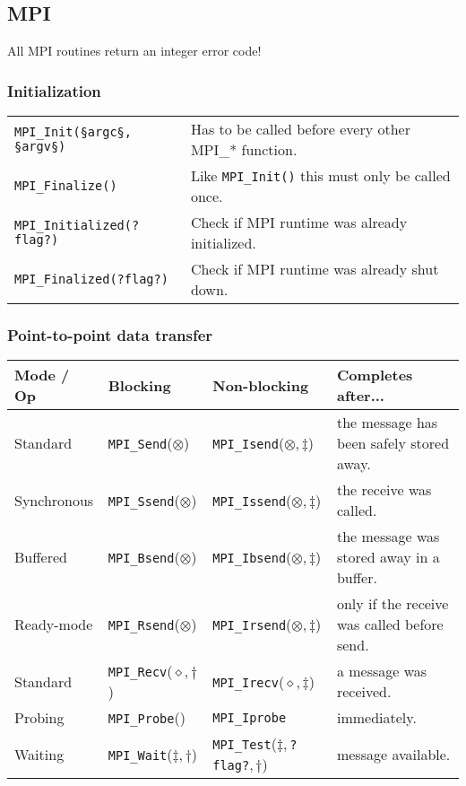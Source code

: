 \documentclass[11pt]{article}
\begin{document}
\subsection{MPI}

All MPI routines return an integer error code!

\subsubsection{Initialization}
\begin{tabular}{ p{8cm} l }
	\lstinline$MPI_Init(§argc§, §argv§)$ & Has to be called before every other MPI\_* function. \\
	\lstinline$MPI_Finalize()$ & Like \lstinline$MPI_Init()$ this must only be called once. \\
	\lstinline$MPI_Initialized(?flag?)$ & Check if MPI runtime was already initialized. \\
	\lstinline$MPI_Finalized(?flag?)$ & Check if MPI runtime was already shut down. \\
\end{tabular}

\subsubsection{Point-to-point data transfer}

\begin{tabular}{ l | l l l }
	\textbf{Mode / Op} & \textbf{Blocking} & \textbf{Non-blocking} & \textbf{Completes after...} \\
	\hline
	Standard	& \lstinline$MPI_Send$($\otimes$) & \lstinline$MPI_Isend$($\otimes, \ddag$) & the message has been safely stored away. \\
	Synchronous	& \lstinline$MPI_Ssend$($\otimes$) & \lstinline$MPI_Issend$($\otimes, \ddag$) & the receive was called. \\
	Buffered	& \lstinline$MPI_Bsend$($\otimes$) & \lstinline$MPI_Ibsend$($\otimes, \ddag$) & the message was stored away in a buffer. \\	
	Ready-mode	& \lstinline$MPI_Rsend$($\otimes$) & \lstinline$MPI_Irsend$($\otimes, \ddag$) & only if the receive was called before send. \\
	\hline
	Standard	& \lstinline$MPI_Recv$($\diamond, \dag$) & \lstinline$MPI_Irecv$($\diamond, \ddag$) & a message was received. \\
	Probing		& \lstinline$MPI_Probe$() & \lstinline$MPI_Iprobe$  & immediately. \\
	Waiting		& \lstinline$MPI_Wait$($\ddag, \dag$) & \lstinline$MPI_Test$($\ddag, $\lstinline$?flag?$$, \dag$) & message available. \\
\end{tabular}
\end{document}
